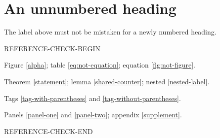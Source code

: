 \section*{An unnumbered heading}\label{unnumbered}
The label above must not be mistaken for a newly numbered heading.

\clearpage
REFERENCE-CHECK-BEGIN
\par
Figure \ref{alpha}; table \ref{eq:not-equation}; equation \ref{fig:not-figure}.
\par
Theorem \ref{statement}; lemma \ref{shared-counter}; nested \ref{nested-label}.
\par
Tags \ref{tag-with-parentheses} and \ref{tag-without-parentheses}.
\par
Panels \ref{panel-one} and \ref{panel-two}; appendix \ref{supplement}.
\par
REFERENCE-CHECK-END

